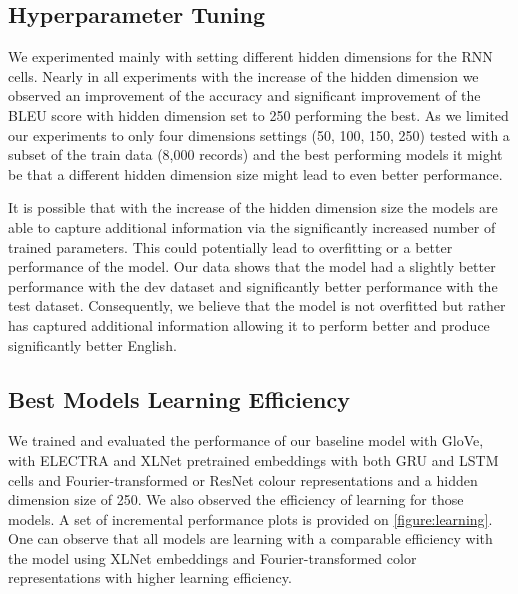 \subsection{Hyperparameter Tuning}
We experimented mainly with setting different hidden dimensions for the RNN cells. Nearly in all experiments with the increase of the hidden dimension we observed an improvement of the accuracy and significant improvement of the BLEU score with hidden dimension set to 250 performing the best. As we limited our experiments to only four dimensions settings (50, 100, 150, 250) tested with a subset of the train data (8,000 records) and the best performing models it might be that a different hidden dimension size might lead to even better performance.

\par
It is possible that with the increase of the hidden dimension size the models are able to capture additional information via the significantly increased number of trained parameters. This could potentially lead to overfitting or a better performance of the model. Our data shows that the model had a slightly better performance with the dev dataset and significantly better performance with the test dataset. Consequently, we believe that the model is not overfitted but rather has captured additional information allowing it to perform better and produce significantly better English.

\subsection{Best Models Learning Efficiency}
We trained and evaluated the performance of our baseline model with GloVe, with ELECTRA and XLNet pretrained embeddings with both GRU and LSTM cells and Fourier-transformed or ResNet colour representations and a hidden dimension size of 250. We also observed the efficiency of learning for those models. A set of incremental performance plots is provided on \ref{figure:learning}. One can observe that all models are learning with a comparable efficiency with the model using XLNet embeddings and Fourier-transformed color representations with higher learning efficiency.

